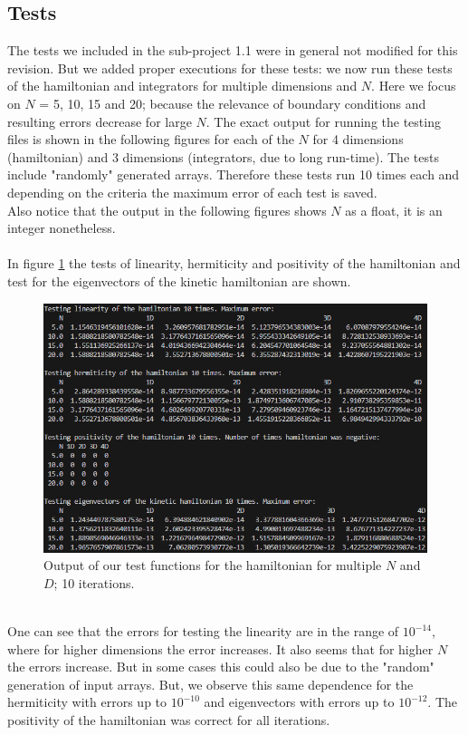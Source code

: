 \documentclass[11pt, letterpaper, onecolumn]{article}
\begin{document}
	\subsection{Tests}
	The tests we included in the sub-project 1.1 were in general not modified for this revision. But we added proper executions for these tests: we now run these tests of the hamiltonian and integrators for multiple dimensions and $N$. Here we focus on $N$ = 5, 10, 15 and 20; because the relevance of boundary conditions and resulting errors decrease for large $N$. The exact output for running the testing files is shown in the following figures for each of the $N$ for 4 dimensions (hamiltonian) and 3 dimensions (integrators, due to long run-time). The tests include "randomly" generated arrays. Therefore these tests run 10 times each and depending on the criteria the maximum error of each test is saved.\\
	Also notice that the output in the following figures shows $N$ as a float, it is an integer nonetheless.
	\\
	\\
	In figure \ref{fig:test-hamiltonian} the tests of linearity, hermiticity and positivity of the hamiltonian and test for the eigenvectors of the kinetic hamiltonian are shown.
	\begin{figure} [h] 
	\begin{center}
	\includegraphics[width=15cm]{"test_hamiltonian2.png"}
	\caption{Output of our test functions for the hamiltonian for multiple $N$ and $D$; 10 iterations.} 	\label{fig:test-hamiltonian}
	\end{center}	
	\end{figure}
	\\
	One can see that the errors for testing the linearity are in the range of $10^{-14}$, where for higher dimensions the error increases. It also seems that for higher $N$ the errors increase. But in some cases this could also be due to the "random" generation of input arrays. But, we observe this same dependence for the hermiticity with errors up to $10^{-10}$ and eigenvectors with errors up to $10^{-12}$. The positivity of the hamiltonian was correct for all iterations.\\
\end{document}

